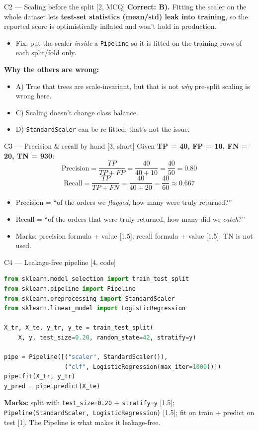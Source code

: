 \documentclass[aspectratio=169,11pt]{beamer}
\begin{document}
\begin{frame}{C2 --- Scaling before the split \hfill [2, MCQ]}
\textbf{Correct: B).} Fitting the scaler on the whole dataset lets \textbf{test-set statistics (mean/std) leak into training}, so the reported score is optimistically inflated and won't hold in production.
\begin{itemize}
  \item Fix: put the scaler \emph{inside} a \texttt{Pipeline} so it is fitted on the training rows of each split/fold only.
\end{itemize}
\textbf{Why the others are wrong:}
\begin{itemize}
  \item A) True that trees are scale-invariant, but that is not \emph{why} pre-split scaling is wrong here.
  \item C) Scaling doesn't change class balance.
  \item D) \texttt{StandardScaler} can be re-fitted; that's not the issue.
\end{itemize}
\end{frame}

\begin{frame}{C3 --- Precision \& recall by hand \hfill [3, short]}
Given \textbf{TP = 40, FP = 10, FN = 20, TN = 930}:
\[
\text{Precision} = \frac{TP}{TP+FP} = \frac{40}{40+10} = \frac{40}{50} = 0.80
\]
\[
\text{Recall} = \frac{TP}{TP+FN} = \frac{40}{40+20} = \frac{40}{60} \approx 0.667
\]
\begin{itemize}
  \item Precision = ``of the orders we \emph{flagged}, how many were truly returned?''
  \item Recall = ``of the orders that were truly returned, how many did we \emph{catch}?''
  \item Marks: precision formula + value [1.5]; recall formula + value [1.5]. TN is not used.
\end{itemize}
\end{frame}

\begin{frame}[fragile]{C4 --- Leakage-free pipeline \hfill [4, code]}
\begin{lstlisting}[language=Python]
from sklearn.model_selection import train_test_split
from sklearn.pipeline import Pipeline
from sklearn.preprocessing import StandardScaler
from sklearn.linear_model import LogisticRegression

X_tr, X_te, y_tr, y_te = train_test_split(
    X, y, test_size=0.20, random_state=42, stratify=y)

pipe = Pipeline([("scaler", StandardScaler()),
                 ("clf", LogisticRegression(max_iter=1000))])
pipe.fit(X_tr, y_tr)
y_pred = pipe.predict(X_te)
\end{lstlisting}
\textbf{Marks:} split with \texttt{test\_size=0.20} + \texttt{stratify=y} [1.5]; \texttt{Pipeline(StandardScaler, LogisticRegression)} [1.5]; fit on train + predict on test [1]. The Pipeline is what makes it leakage-free.
\end{frame}
\end{document}

